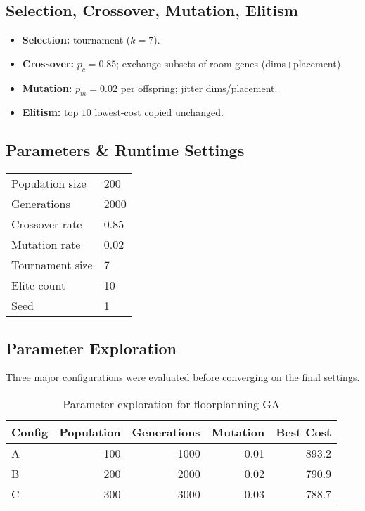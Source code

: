 \documentclass{article}
\begin{document}
\subsection{Selection, Crossover, Mutation, Elitism}
\begin{itemize}
    \item \textbf{Selection:} tournament ($k{=}7$).
    \item \textbf{Crossover:} $p_c{=}0.85$; exchange subsets of room genes (dims+placement).
    \item \textbf{Mutation:} $p_m{=}0.02$ per offspring; jitter dims/placement.
    \item \textbf{Elitism:} top $10$ lowest-cost copied unchanged.
\end{itemize}

\subsection{Parameters \& Runtime Settings}
\begin{center}
\begin{tabular}{ll}
Population size & 200 \\
Generations     & 2000 \\
Crossover rate  & 0.85 \\
Mutation rate   & 0.02 \\
Tournament size & 7 \\
Elite count     & 10 \\
Seed            & 1 \\
\end{tabular}
\end{center}

\subsection{Parameter Exploration}
Three major configurations were evaluated before converging on the final settings.
\begin{table}[H]
\centering
\caption{Parameter exploration for floorplanning GA}
\label{tab:floorplan_params}
\begin{tabular}{lrrrr}
\toprule
Config & Population & Generations & Mutation & Best Cost \\
\midrule
A & 100 & 1000 & 0.01 & 893.2 \\
B & 200 & 2000 & 0.02 & 790.9 \\
C & 300 & 3000 & 0.03 & 788.7 \\
\bottomrule
\end{tabular}
\end{table}
\end{document}
